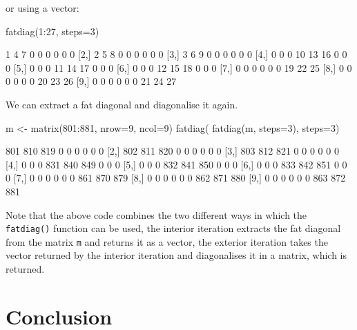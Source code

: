 \documentclass[article]{jss}
\begin{document}
or using a vector:

\begin{CodeChunk}
\begin{CodeInput}
fatdiag(1:27, steps=3)
\end{CodeInput}
\begin{CodeOutput}
      [,1] [,2] [,3] [,4] [,5] [,6] [,7] [,8] [,9]
 [1,]    1    4    7    0    0    0    0    0    0
 [2,]    2    5    8    0    0    0    0    0    0
 [3,]    3    6    9    0    0    0    0    0    0
 [4,]    0    0    0   10   13   16    0    0    0
 [5,]    0    0    0   11   14   17    0    0    0
 [6,]    0    0    0   12   15   18    0    0    0
 [7,]    0    0    0    0    0    0   19   22   25
 [8,]    0    0    0    0    0    0   20   23   26
 [9,]    0    0    0    0    0    0   21   24   27
\end{CodeOutput}
\end{CodeChunk}

We can extract a fat diagonal and diagonalise it again.

\begin{CodeChunk}
\begin{CodeInput}
m <- matrix(801:881, nrow=9, ncol=9)
fatdiag( fatdiag(m, steps=3), steps=3)
\end{CodeInput}
\begin{CodeOutput}
      [,1] [,2] [,3] [,4] [,5] [,6] [,7] [,8] [,9]
 [1,]  801  810  819    0    0    0    0    0    0
 [2,]  802  811  820    0    0    0    0    0    0
 [3,]  803  812  821    0    0    0    0    0    0
 [4,]    0    0    0  831  840  849    0    0    0
 [5,]    0    0    0  832  841  850    0    0    0
 [6,]    0    0    0  833  842  851    0    0    0
 [7,]    0    0    0    0    0    0  861  870  879
 [8,]    0    0    0    0    0    0  862  871  880
 [9,]    0    0    0    0    0    0  863  872  881
\end{CodeOutput}
\end{CodeChunk}

Note that the above code combines the two different ways in which the
\texttt{fatdiag()} function can be used, the interior iteration extracts
the fat diagonal from the matrix \texttt{m} and returns it as a vector,
the exterior iteration takes the vector returned by the interior
iteration and diagonalises it in a matrix, which is returned.

\section{Conclusion}\label{conclusion}
\end{document}
